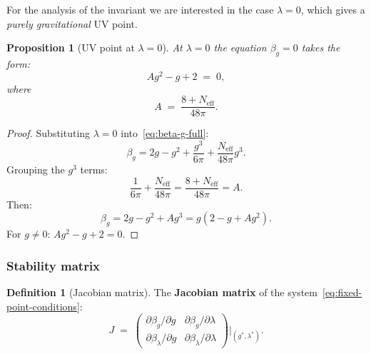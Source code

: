 \documentclass[11pt,a4paper]{article}
\newtheorem{proposition}[theorem]{Proposition}
\theoremstyle{definition}
\newtheorem{definition}[theorem]{Definition}
\begin{document}
\medskip\noindent
For the analysis of the invariant we are interested in the case $\lambda = 0$,
which gives a \emph{purely gravitational} UV point.

\begin{proposition}[UV point at $\lambda = 0$]
\label{prop:uv-lambda-zero}
At $\lambda = 0$ the equation $\beta_g = 0$ takes the form:
\begin{equation}
    A g^2 - g + 2 \;=\; 0,
    \label{eq:uv-quadratic}
\end{equation}
where
\begin{equation}
    \boxed{
    A \;=\; \frac{8 + N_{\text{eff}}}{48\pi}.
    }
    \label{eq:A-coefficient}
\end{equation}
\end{proposition}

\begin{proof}
Substituting $\lambda = 0$ into~\eqref{eq:beta-g-full}:
\begin{equation}
    \beta_g = 2g - g^2 + \frac{g^3}{6\pi}
    + \frac{N_{\text{eff}}}{48\pi} g^3.
\end{equation}
Grouping the $g^3$ terms:
\begin{equation}
    \frac{1}{6\pi} + \frac{N_{\text{eff}}}{48\pi}
    = \frac{8 + N_{\text{eff}}}{48\pi} = A.
\end{equation}
Then:
\begin{equation}
    \beta_g = 2g - g^2 + A g^3 = g(2 - g + A g^2).
\end{equation}
For $g \neq 0$: $A g^2 - g + 2 = 0$.
\end{proof}

\subsubsection{Stability matrix}

\begin{definition}[Jacobian matrix]
\label{def:jacobian}
The \textbf{Jacobian matrix} of the system~\eqref{eq:fixed-point-conditions}:
\begin{equation}
    J \;=\; \begin{pmatrix}
        \partial \beta_g / \partial g & \partial \beta_g / \partial \lambda \\[0.3em]
        \partial \beta_\lambda / \partial g & \partial \beta_\lambda / \partial \lambda
    \end{pmatrix}\bigg|_{(g^*, \lambda^*)}.
    \label{eq:jacobian}
\end{equation}
\end{definition}
\end{document}
